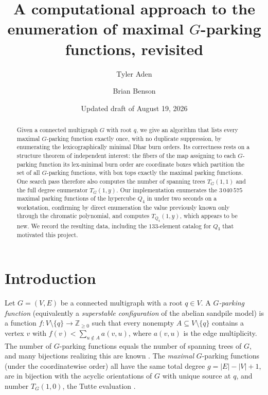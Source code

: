 \documentclass[11pt]{amsart}
\title[Enumeration of maximal $G$-parking functions]{A computational
approach to the enumeration of maximal $G$-parking functions, revisited}
\author{Tyler Aden}
\author{Brian Benson}
\date{Updated draft of August 19, 2026}
\theoremstyle{definition}
\newcommand{\ZZ}{\mathbb{Z}}
\begin{document}
\maketitle

\begin{abstract}
Given a connected multigraph $G$ with root $q$, we give an algorithm that
lists every maximal $G$-parking function exactly once, with no duplicate
suppression, by enumerating the lexicographically minimal Dhar burn orders.
Its correctness rests on a structure theorem of independent interest: the
fibers of the map assigning to each $G$-parking function its lex-minimal
burn order are coordinate boxes which partition the set of all $G$-parking
functions, with box tops exactly the maximal parking functions. One search
pass therefore also computes the number of spanning trees $T_G(1,1)$ and the
full degree enumerator $T_G(1,y)$. Our implementation enumerates the
$3\,040\,575$ maximal parking functions of the hypercube $Q_4$ in under two
seconds on a workstation, confirming by direct enumeration the value
previously known only through the chromatic polynomial, and computes
$T_{Q_4}(1,y)$, which appears to be new. We record the resulting data,
including the $133$-element catalog for $Q_3$ that motivated this project.
\end{abstract}

\section{Introduction}

Let $G=(V,E)$ be a connected multigraph with a root $q \in V$. A
\emph{$G$-parking function} \cite{ps} (equivalently a \emph{superstable
configuration} of the abelian sandpile model) is a function
$f\colon V\setminus\{q\}\to\ZZ_{\ge0}$ such that every nonempty
$A\subseteq V\setminus\{q\}$ contains a vertex $v$ with
$f(v) < \sum_{u\notin A} a(v,u)$, where $a(v,u)$ is the edge multiplicity.
The number of $G$-parking functions equals the number of spanning trees of
$G$, and many bijections realizing this are known
\cite{cl,cp,bct}. The \emph{maximal} $G$-parking functions (under the
coordinatewise order) all have the same total degree $g = |E|-|V|+1$, are in
bijection with the acyclic orientations of $G$ with unique source at $q$,
and number $T_G(1,0)$, the Tutte evaluation \cite{bct}.
\end{document}
